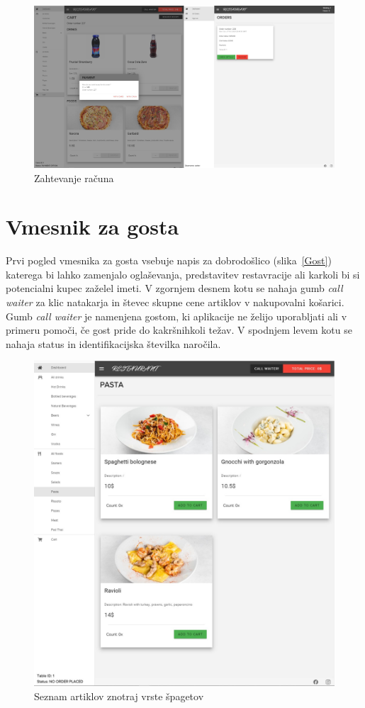 \documentclass[a4paper, 12pt]{book}
\begin{document}
\begin{figure}[!htb]
\begin{center}
\includegraphics[width=14.5cm]{opis6.jpg}
\caption{Zahtevanje računa}
\label{Opis6}
\end{center}
\end{figure}


\section{Vmesnik za gosta}
Prvi pogled vmesnika za gosta vsebuje napis za dobrodošlico (slika~\ref{Gost}) katerega bi lahko zamenjalo oglaševanja, predstavitev restavracije ali karkoli bi si potencialni kupec zaželel imeti. V zgornjem desnem kotu se nahaja gumb \textit{call waiter} za klic natakarja in števec skupne cene artiklov v nakupovalni košarici. Gumb \textit{call waiter} je namenjena gostom, ki aplikacije ne želijo uporabljati ali v primeru pomoči, če gost pride do kakršnihkoli težav. V spodnjem levem kotu se nahaja status in identifikacijska številka naročila. 
\begin{figure}[!htb]
\begin{center}
\includegraphics[width=12cm]{gost_3.jpg}
\caption{Seznam artiklov znotraj vrste špagetov}
\label{Gost_3}
\end{center}
\end{figure}
\end{document}
